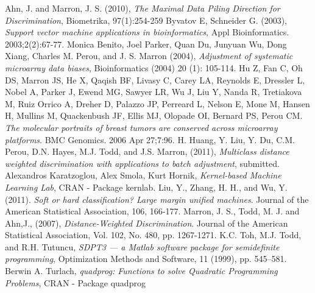 \documentclass{bioinfo}
\begin{document}
\begin{thebibliography}{}

Ahn, J. and Marron, J. S. (2010),
  \textit{The Maximal Data Piling Direction for Discrimination},
  Biometrika, 97(1):254-259
Byvatov E, Schneider G. (2003),
  \textit{Support vector machine applications in bioinformatics}, Appl
  Bioinformatics. 2003;2(2):67-77.
Monica Benito, Joel Parker, Quan Du,
  Junyuan Wu, Dong Xiang, Charles M. Perou, and J. S. Marron (2004),
  \textit{Adjustment of systematic microarray data biases},
  Bioinformatics (2004) 20 (1): 105-114.
Hu Z, Fan C, Oh DS, Marron JS, He X, Qaqish
  BF, Livasy C, Carey LA, Reynolds E, Dressler L, Nobel A, Parker J,
  Ewend MG, Sawyer LR, Wu J, Liu Y, Nanda R, Tretiakova M, Ruiz Orrico
  A, Dreher D, Palazzo JP, Perreard L, Nelson E, Mone M, Hansen H,
  Mullins M, Quackenbush JF, Ellis MJ, Olopade OI, Bernard PS, Perou
  CM. \textit{The molecular portraits of breast tumors are conserved
    across microarray platforms}. BMC Genomics. 2006 Apr 27;7:96.
H. Huang, Y. Liu, Y. Du, C.M. Perou,
  D.N.  Hayes, M.J. Todd, and J.S. Marron, (2011), \textit{Multiclass
    distance weighted discrimination with applications to batch
    adjustment}, submitted.
Alexandros Karatzoglou, Alex Smola,
  Kurt Hornik, \textit{Kernel-based Machine Learning Lab}, CRAN -
  Package kernlab.
Liu, Y., Zhang, H. H., and Wu, Y. (2011).
  \textit{Soft or hard classification? Large margin unified
    machines}. Journal of the American Statistical Association, 106,
  166-177.
 Marron, J. S., Todd, M. J. and
  Ahn,J., (2007), \textit{Distance-Weighted Discrimination}. Journal
  of the American Statistical Association, Vol. 102, No. 480,
  pp. 1267-1271.
K.C. Toh, M.J. Todd, and R.H. Tutuncu,
  \textit{SDPT3 --- a Matlab software package for semidefinite
    programming}, Optimization Methods and Software, 11 (1999),
  pp. 545--581.
Berwin A. Turlach, \textit{quadprog:
  Functions to solve Quadratic Programming Problems}, CRAN - Package
  quadprog

\end{thebibliography}
\end{document}
